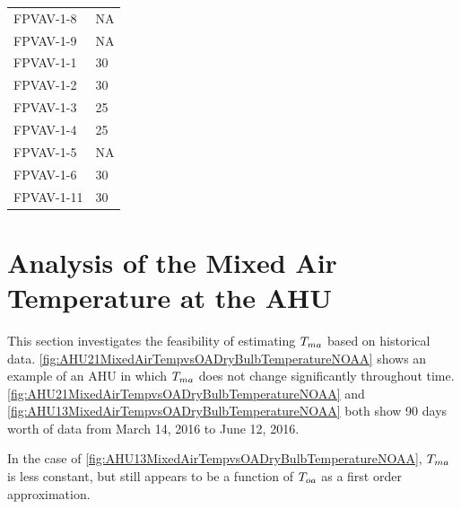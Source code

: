 \begin{table}[]
\begin{tabular}{ll}
FPVAV-1-8           & NA               \\
FPVAV-1-9           & NA               \\
FPVAV-1-1           & 30               \\
FPVAV-1-2           & 30               \\
FPVAV-1-3           & 25               \\
FPVAV-1-4           & 25               \\
FPVAV-1-5           & NA               \\
FPVAV-1-6           & 30               \\
FPVAV-1-11          & 30               \\ \bottomrule
\end{tabular}
\end{table}




\section{Analysis of the Mixed Air Temperature at the AHU}

This section investigates the feasibility of estimating \(T_{ma}\) based
on historical data. \figref{}
\ref{fig:AHU21MixedAirTempvsOADryBulbTemperatureNOAA} shows an example
of an AHU in which \(T_{ma}\) does not change significantly throughout
time. \figref{} \ref{fig:AHU21MixedAirTempvsOADryBulbTemperatureNOAA}
and \ref{fig:AHU13MixedAirTempvsOADryBulbTemperatureNOAA} both show 90
days worth of data from March 14, 2016 to June 12, 2016. 

In the case of \figref{}
\ref{fig:AHU13MixedAirTempvsOADryBulbTemperatureNOAA}, \(T_{ma}\) is less
constant, but still appears to be a function of \(T_{oa}\) as a first
order approximation. 


